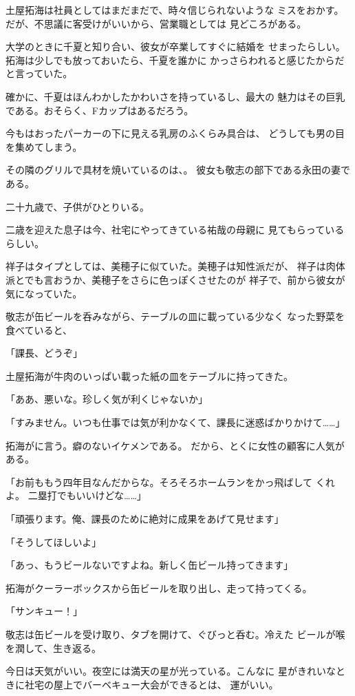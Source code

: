 ﻿\documentclass[
    book,tate,
    line_length=30zw,
    jafontsize=12pt,
    paper=b5j,
    landscape,
    ]{jlreq}
\begin{document}
土屋拓海は社員としてはまだまだで、時々信じられないような
ミスをおかす。だが、不思議に客受けがいいから、営業職としては
見どころがある。

大学のときに千夏と知り合い、彼女が卒業してすぐに結婚を
せまったらしい。拓海は少しでも放っておいたら、千夏を誰かに
かっさらわれると感じたからだと言っていた。

確かに、千夏はほんわかしたかわいさを持っているし、最大の
魅力はその巨乳である。おそらく、Fカップはあるだろう。

今もはおったパーカーの下に見える乳房のふくらみ具合は、
どうしても男の目を集めてしまう。

その隣のグリルで具材を焼いているのは、。
彼女も敬志の部下である永田の妻である。

二十九歳で、子供がひとりいる。

二歳を迎えた息子は今、社宅にやってきている祐哉の母親に
見てもらっているらしい。

祥子はタイプとしては、美穂子に似ていた。美穂子は知性派だが、
祥子は肉体派とでも言おうか、美穂子をさらに色っぽくさせたのが
祥子で、前から彼女が気になっていた。

敬志が缶ビールを呑みながら、テーブルの皿に載っている少なく
なった野菜を食べていると、

「課長、どうぞ」

土屋拓海が牛肉のいっぱい載った紙の皿をテーブルに持ってきた。

「ああ、悪いな。珍しく気が利くじゃないか」

「すみません。いつも仕事では気が利かなくて、課長に迷惑ばかりかけて……」

拓海がに言う。癖のないイケメンである。
だから、とくに女性の顧客に人気がある。

「お前ももう四年目なんだからな。そろそろホームランをかっ飛ばして
くれよ。 二塁打でもいいけどな……」

「頑張ります。俺、課長のために絶対に成果をあげて見せます」

「そうしてほしいよ」

「あっ、もうビールないですよね。新しく缶ビール持ってきます」

拓海がクーラーボックスから缶ビールを取り出し、走って持ってくる。

「サンキュー！」

敬志は缶ビールを受け取り、タブを開けて、ぐびっと呑む。冷えた
ビールが喉を潤して、生き返る。

今日は天気がいい。夜空には満天の星が光っている。こんなに
星がきれいなときに社宅の屋上でバーベキュー大会ができるとは、
運がいい。
\end{document}
